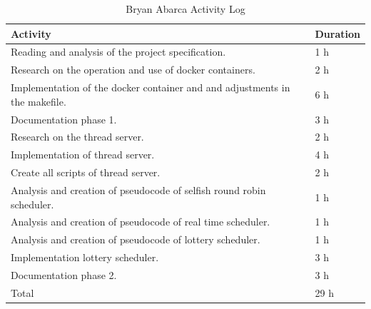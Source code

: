 \documentclass{article}
\begin{document}
\begin{table}[H]
\centering
\caption{Bryan Abarca Activity Log}
\begin{tabular}{|p{7cm}|p{7cm}|}
\hline
\textbf{Activity} & \textbf{Duration} \\ \hline
Reading and analysis of the project specification. & 1 h \\ \hline
Research on the operation and use of docker containers. & 2 h\\ \hline
Implementation of the docker container and and adjustments in the makefile. & 6 h\\ \hline
Documentation phase 1. & 3 h\\ \hline
Research on the thread server. & 2 h\\ \hline
Implementation of thread server. & 4 h\\ \hline
Create all scripts of thread server. & 2 h\\ \hline
Analysis and creation of pseudocode of selfish round robin scheduler. & 1 h\\ \hline
Analysis and creation of pseudocode of real time scheduler. & 1 h\\ \hline
Analysis and creation of pseudocode of lottery scheduler. & 1 h\\ \hline
Implementation lottery scheduler. & 3 h\\ \hline
Documentation phase 2. & 3 h\\ \hline
Total & 29 h\\ \hline
\end{tabular}
\end{table}
\end{document}
